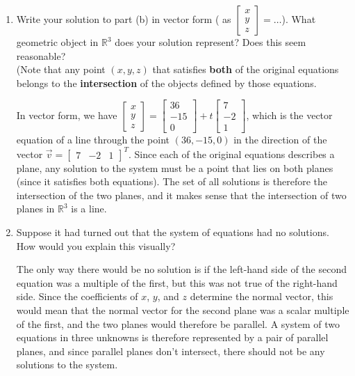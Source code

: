 \documentclass[12pt]{article}
\newcommand{\R}{\mathbb{R}}
\newcommand{\bbm}{\begin{bmatrix}}
\newcommand{\ebm}{\end{bmatrix}}
\begin{document}
\begin{enumerate}
\begin{enumerate}
 \item Write your solution to part (b) in vector form ( as $\bbm x\\y\\z\ebm = \ldots$). What geometric object in $\R^3$ does your solution represent? Does this seem reasonable?\\ (Note that any point $(x,y,z)$ that satisfies {\bf both} of the original equations belongs to the {\bf intersection} of the objects defined by those equations.

\bigskip

In vector form, we have $\bbm x\\y\\z\ebm = \bbm 36\\-15\\0\ebm + t\bbm 7\\-2\\1\ebm$, which is the vector equation of a line through the point $(36,-15,0)$ in the direction of the vector $\vec{v} = \bbm 7&-2&1\ebm^T$. Since each of the original equations describes a plane, any solution to the system must be a point that lies on both planes (since it satisfies both equations). The set of all solutions is therefore the intersection of the two planes, and it makes sense that the intersection of two planes in $\R^3$ is a line.

\item Suppose it had turned out that the system of equations had no solutions. How would you explain this visually?

\bigskip

The only way there would be no solution is if the left-hand side of the second equation was a multiple of the first, but this was not true of the right-hand side. Since the coefficients of $x$, $y$, and $z$ determine the normal vector, this would mean that the normal vector for the second plane was a scalar multiple of the first, and the two planes would therefore be parallel. A system of two equations in three unknowns is therefore represented by a pair of parallel planes, and since parallel planes don't intersect, there should not be any solutions to the system.
\end{enumerate}




 \end{enumerate}
\end{document}
